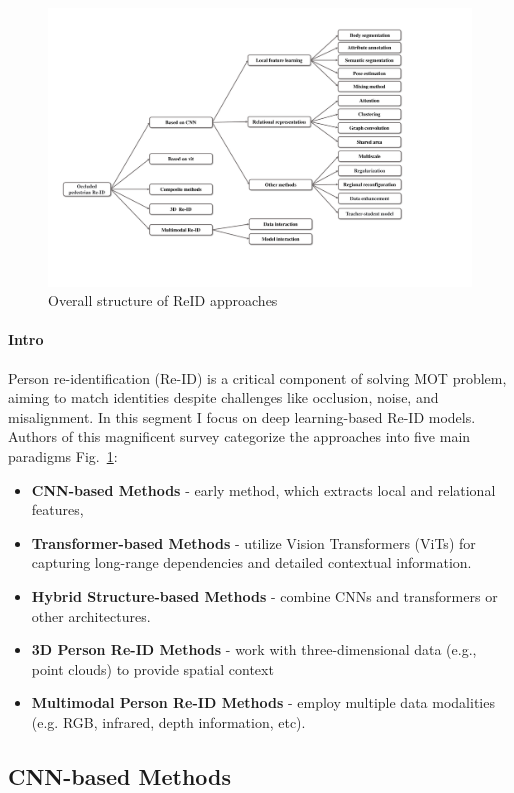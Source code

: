 \documentclass[12pt, a4paper]{article}
\begin{document}
\begin{figure}[h]
    \centering
    \includegraphics[width=0.8\linewidth]{pictures/reid_models_cat.pdf}
    \caption{Overall structure of ReID approaches}
    \label{fig:reid_models_cat}
\end{figure}

\paragraph{Intro} Person re-identification (Re-ID) is a critical component of solving MOT problem, aiming to match identities despite challenges like occlusion, noise, and misalignment. In this segment I focus on deep learning-based Re-ID models. Authors of this magnificent survey \cite{reid_survey} categorize the approaches into five main paradigms Fig.~\ref{fig:reid_models_cat}:
\begin{itemize}
    \item \textbf{CNN-based Methods} - early method, which extracts local and relational features, 
    \item \textbf{Transformer-based Methods} - utilize Vision Transformers (ViTs) for capturing long-range dependencies and detailed contextual information. 
    \item \textbf{Hybrid Structure-based Methods} - combine CNNs and transformers or other architectures.
    \item \textbf{3D Person Re-ID Methods} - work with three-dimensional data (e.g., point clouds) to provide spatial context
    \item \textbf{Multimodal Person Re-ID Methods} - employ multiple data modalities (e.g. RGB, infrared, depth information, etc).
\end{itemize}

\subsection{CNN-based Methods}
\end{document}
